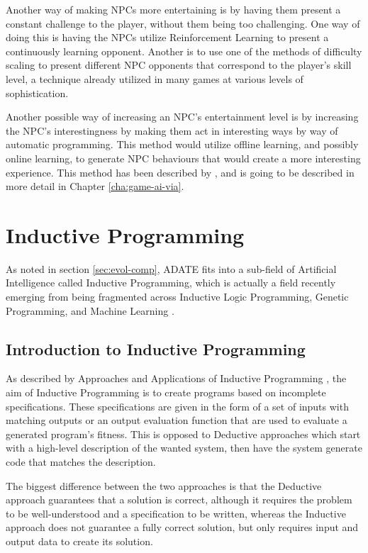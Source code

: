 \documentclass[]{report}
\begin{document}
Another way of making NPCs more entertaining is by having them present a
constant challenge to the player, without them being too challenging. One way of
doing this is having the NPCs utilize Reinforcement Learning
\citep{merrick2006motivated,sutton1998reinforcement} to present a continuously
learning opponent. Another is to use one of the methods of difficulty scaling to
present different NPC opponents that correspond to the player's skill level, a
technique already utilized in many games at various levels of sophistication.

Another possible way of increasing an NPC's entertainment level is by increasing
the NPC's interestingness by making them act in interesting ways by way of
automatic programming. This method would utilize offline learning, and possibly
online learning, to generate NPC behaviours that would create a more interesting
experience. This method has been described by \citet{yannakakis2005ai}, and is
going to be described in more detail in Chapter \ref{cha:game-ai-via}.

\chapter{Inductive Programming}
\label{cha:induct-progr}

As noted in section \ref{sec:evol-comp}, ADATE \citep{olsson1995inductive} fits
into a sub-field of Artificial Intelligence called Inductive Programming, which is
actually a field recently emerging from being fragmented across Inductive Logic
Programming, Genetic Programming, and Machine Learning
\citep{kitzelmann2010inductive}.

\section{Introduction to Inductive Programming}
\label{sec:intr-induct-progr}

As described by Approaches and Applications of Inductive Programming
\citep{aaip2010intro}, the aim of Inductive Programming is to create programs
based on incomplete specifications. These specifications are given in the form
of a set of inputs with matching outputs or an output evaluation function that
are used to evaluate a generated program's fitness. This is opposed to Deductive
approaches which start with a high-level description of the wanted system, then
have the system generate code that matches the description.

The biggest difference between the two approaches is that the Deductive approach
guarantees that a solution is correct, although it requires the problem to be
well-understood and a specification to be written, whereas the Inductive
approach does not guarantee a fully correct solution, but only requires input
and output data to create its solution.
\end{document}
